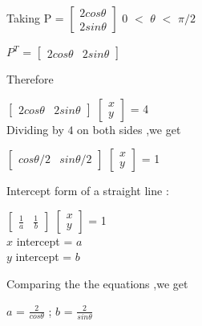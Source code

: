 \documentclass{beamer}
\begin{document}
\begin{frame}

Taking P = 
$
\begin{bmatrix}
2cos\theta\\
2sin\theta
\end{bmatrix}
$
\hspace{3cm}
$0$ $<$ $\theta$ $<$ $\pi/2$
\vspace{1cm}

$P^T$ =
$ \begin{bmatrix}
2cos\theta &
2sin\theta
\end{bmatrix}
$
\vspace{1cm}

Therefore 

$ \begin{bmatrix}
2cos\theta &
2sin\theta
\end{bmatrix}
$ $ \begin{bmatrix}
x \\y

\end{bmatrix}
$ = 4\\
\vspace{0.5cm}
Dividing by $4$ on both sides ,we get

$ \begin{bmatrix}
cos\theta/2 &
sin\theta/2
\end{bmatrix}
$ $ \begin{bmatrix}
x \\y

\end{bmatrix}
$ = 1

\end{frame}
\begin{frame}


Intercept form of a straight line :



$ \begin{bmatrix}
\frac{1}{a}&
\frac{1}{b}
\end{bmatrix}
$ $ \begin{bmatrix}
x \\y

\end{bmatrix}
$ = 1\\

\vspace{1cm}
$x$ intercept = $a$
\\
$y$ intercept = $b$
\vspace{1cm}


Comparing the the equations ,we get 

$a$ = $\frac{2}{cos\theta}$  ;
$b$ = $\frac{2}{sin\theta}$

\end{frame}
\end{document}
